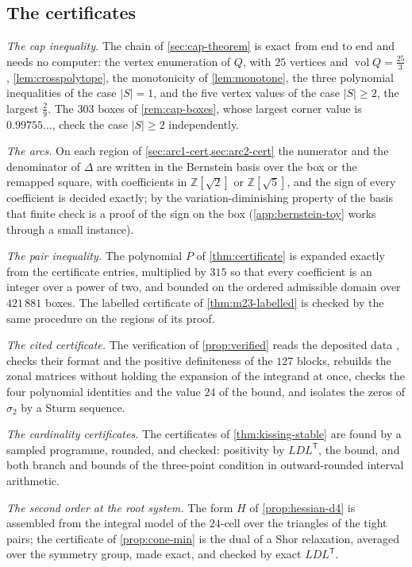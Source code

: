 \documentclass[11pt,reqno]{amsart}
\renewcommand{\_}{\origunderscore\allowbreak}
\numberwithin{equation}{section}
\theoremstyle{plain}
\theoremstyle{definition}
\theoremstyle{remark}
\newcommand{\defect}{\Delta}                 %
\DeclareMathOperator{\vol}{vol}
\begin{document}
\subsection*{The certificates}

\emph{The cap inequality.} The chain of \cref{sec:cap-theorem} is exact from
end to end and needs no computer: the vertex enumeration of $Q$, with $25$
vertices and $\vol Q=\frac{25}3$, \cref{lem:crosspolytope}, the
monotonicity of \cref{lem:monotone}, the three polynomial inequalities of
the case $|S|=1$, and the five vertex values of the case $|S|\ge2$, the
largest $\frac29$. The $303$ boxes of \cref{rem:cap-boxes}, whose largest
corner value is $0.99755\ldots$, check the case $|S|\ge2$ independently.

\emph{The arcs.} On each region of \cref{sec:arc1-cert,sec:arc2-cert} the
numerator and the denominator of $\defect$ are written in the Bernstein
basis over the box or the remapped square, with coefficients in
$\mathbb{Z}[\sqrt2]$ or $\mathbb{Z}[\sqrt5]$, and the sign of every
coefficient is decided exactly; by the variation-diminishing property of
the basis \cite{Far12} that finite check is a proof of the sign on the
box (\cref{app:bernstein-toy} works through a small instance).

\emph{The pair inequality.} The polynomial $P$ of \cref{thm:certificate} is
expanded exactly from the certificate entries, multiplied by $315$ so that
every coefficient is an integer over a power of two, and bounded on the
ordered admissible domain over $421\,881$ boxes. The labelled certificate
of \cref{thm:m23-labelled} is checked by the same procedure on the regions
of its proof.

\emph{The cited certificate.} The verification of \cref{prop:verified}
reads the deposited data \cite{LLM24data}, checks their format and the
positive definiteness of the $127$ blocks, rebuilds the zonal matrices
without holding the expansion of the integrand at once, checks the four
polynomial identities and the value $24$ of the bound, and isolates the
zeros of $\sigma_2$ by a Sturm sequence.

\emph{The cardinality certificates.} The certificates of
\cref{thm:kissing-stable} are found by a sampled programme, rounded, and
checked: positivity by $LDL^{\mathsf T}$, the bound, and both branch and
bounds of the three-point condition in outward-rounded interval
arithmetic.

\emph{The second order at the root system.} The form $H$ of
\cref{prop:hessian-d4} is assembled from the integral model of the
$24$-cell over the triangles of the tight pairs; the certificate of
\cref{prop:cone-min} is the dual of a Shor relaxation, averaged over the
symmetry group, made exact, and checked by exact $LDL^{\mathsf T}$.
\end{document}
